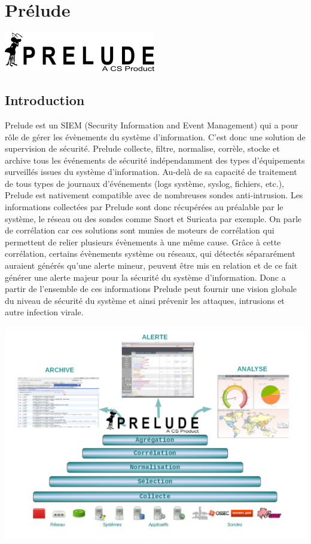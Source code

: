 \documentclass[a4paper,11pt,french]{article}
\begin{document}
\newpage
\section{Prélude}

\begin{center}\includegraphics{icons/prelude-logo.png}\end{center}

\subsection{Introduction}
Prelude est un SIEM (Security Information and Event Management) qui a pour rôle de gérer les évènements du système d’information. C’est donc une solution de supervision de sécurité. Prelude collecte, filtre, normalise, corrèle, stocke et archive tous les événements de sécurité indépendamment des types d’équipements surveillés issues du système d'information. Au-delà de sa capacité de traitement de tous types de journaux d’événements (logs système, syslog, fichiers, etc.), Prelude est nativement compatible avec de nombreuses sondes anti-intrusion. Les informations collectées par Prelude sont donc récupérées au préalable par le système, le réseau ou des sondes comme Snort et Suricata par exemple. 
On parle de corrélation car ces solutions sont munies de moteurs de corrélation qui permettent de relier plusieurs évènements à une même cause. Grâce à cette corrélation, certains évènements système ou réseaux, qui détectés sépararément auraient générés qu’une alerte mineur, peuvent être mis en relation et de ce fait générer une alerte majeur pour la sécurité du système d’information.
Donc a partir de l'ensemble de ces informations Prelude peut fournir une vision globale du niveau de sécurité du système et ainsi prévenir les attaques, intrusions et autre infection virale. 

\begin{center}\includegraphics[width=17cm]{icons/Prelude-Archi-Market-2a.png}\end{center}
\end{document}

